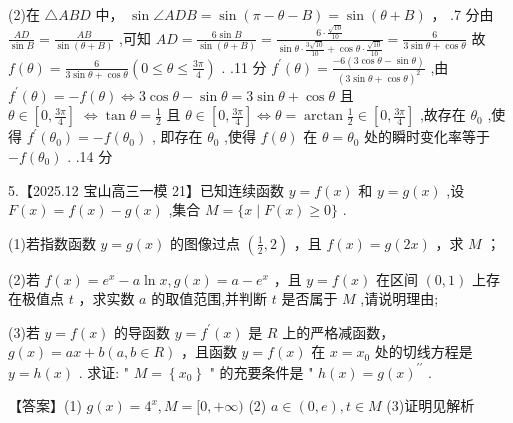 \documentclass[10pt]{article}
\begin{document}
(2)在 \(\bigtriangleup {ABD}\) 中， \(\sin \angle {ADB} = \sin \left( {\pi  - \theta  - B}\right)  = \sin \left( {\theta  + B}\right)\) ， .7 分由 \(\frac{AD}{\sin B} = \frac{AB}{\sin \left( {\theta  + B}\right) }\) ,可知 \({AD} = \frac{6\sin B}{\sin \left( {\theta  + B}\right) } = \frac{6 \cdot  \frac{\sqrt{10}}{10}}{\sin \theta  \cdot  \frac{3\sqrt{10}}{10} + \cos \theta  \cdot  \frac{\sqrt{10}}{10}} = \frac{6}{3\sin \theta  + \cos \theta }\) 故 \(f\left( \theta \right)  = \frac{6}{3\sin \theta  + \cos \theta }\left( {0 \leq  \theta  \leq  \frac{3\pi }{4}}\right)\) . .11 分 \({f}^{\prime }\left( \theta \right)  = \frac{-6\left( {3\cos \theta  - \sin \theta }\right) }{{\left( 3\sin \theta  + \cos \theta \right) }^{2}}\) ,由 \({f}^{\prime }\left( \theta \right)  =  - f\left( \theta \right)  \Leftrightarrow  3\cos \theta  - \sin \theta  = 3\sin \theta  + \cos \theta\) 且 \(\theta  \in  \left\lbrack  {0,\frac{3\pi }{4}}\right\rbrack \; \Leftrightarrow  \tan \theta  = \frac{1}{2}\) 且 \(\theta  \in  \left\lbrack  {0,\frac{3\pi }{4}}\right\rbrack   \Leftrightarrow  \theta  = \arctan \frac{1}{2} \in  \left\lbrack  {0,\frac{3\pi }{4}}\right\rbrack\) ,故存在 \({\theta }_{0}\) ,使得 \({f}^{\prime }\left( {\theta }_{0}\right)  =  - f\left( {\theta }_{0}\right)\) , 即存在 \({\theta }_{0}\) ,使得 \(f\left( \theta \right)\) 在 \(\theta  = {\theta }_{0}\) 处的瞬时变化率等于 \(- f\left( {\theta }_{0}\right)\) . .14 分

5.【2025.12 宝山高三一模 21】已知连续函数 \(y = f\left( x\right)\) 和 \(y = g\left( x\right)\) ,设 \(F\left( x\right)  = f\left( x\right)  - g\left( x\right)\) ,集合 \(M = \{ x \mid  F\left( x\right)  \geq  0\}\) .

(1)若指数函数 \(y = g\left( x\right)\) 的图像过点 \(\left( {\frac{1}{2},2}\right)\) ，且 \(f\left( x\right)  = g\left( {2x}\right)\) ，求 \(M\) ；

(2)若 \(f\left( x\right)  = {e}^{x} - a\ln x,g\left( x\right)  = a - {e}^{x}\) ，且 \(y = f\left( x\right)\) 在区间 \(\left( {0,1}\right)\) 上存在极值点 \(t\) ，求实数 \(a\) 的取值范围,并判断 \(t\) 是否属于 \(M\) ,请说明理由;

(3)若 \(y = f\left( x\right)\) 的导函数 \(y = {f}^{\prime }\left( x\right)\) 是 \(R\) 上的严格减函数， \(g\left( x\right)  = {ax} + b\left( {a,b \in  R}\right)\) ，且函数 \(y = f\left( x\right)\) 在 \(x = {x}_{0}\) 处的切线方程是 \(y = h\left( x\right)\) . 求证: " \(M = \left\{  {x}_{0}\right\}\) " 的充要条件是 " \(h\left( x\right)  = g{\left( x\right) }^{\prime \prime }\) .

【答案】(1) \(g\left( x\right)  = {4}^{x},M = \lbrack 0, + \infty )\) (2) \(a \in  \left( {0,e}\right) ,t \in  M\) (3)证明见解析
\end{document}
